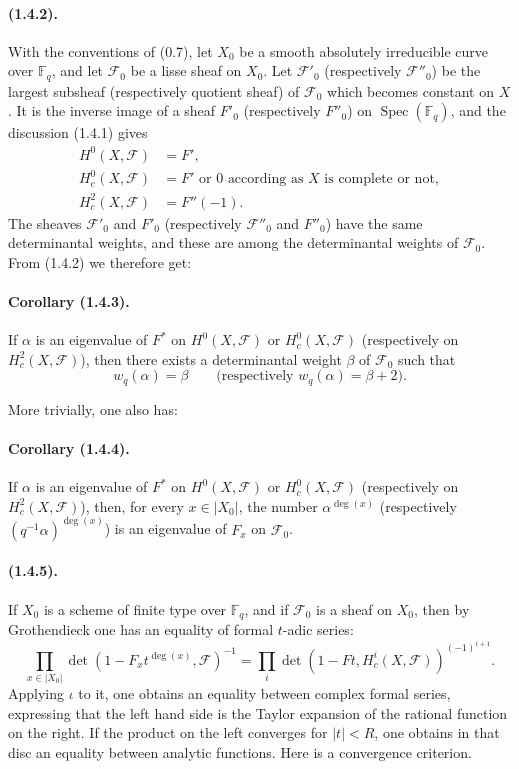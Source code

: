 \documentclass[11pt]{article}
\theoremstyle{remark}
\newcommand{\Fq}{\mathbb{F}_q}
\newcommand{\Spec}{\operatorname{Spec}}
\begin{document}
\paragraph{(1.4.2).} With the conventions of (0.7), let $X_0$ be a smooth absolutely irreducible curve over $\Fq$, and let $\mathcal F_0$ be a lisse sheaf on $X_0$. Let $\mathcal F'_0$ (respectively $\mathcal F''_0$) be the largest subsheaf (respectively quotient sheaf) of $\mathcal F_0$ which becomes constant on $X$. It is the inverse image of a sheaf $F'_0$ (respectively $F''_0$) on $\Spec(\Fq)$, and the discussion (1.4.1) gives
\begin{align}
H^0(X,\mathcal F)&=F',\tag{1.4.2.1}\\
H^0_c(X,\mathcal F)&=F'\text{ or }0\text{ according as }X\text{ is complete or not},\tag{1.4.2.2}\\
H^2_c(X,\mathcal F)&=F''(-1).\tag{1.4.2.3}
\end{align}
The sheaves $\mathcal F'_0$ and $F'_0$ (respectively $\mathcal F''_0$ and $F''_0$) have the same determinantal weights, and these are among the determinantal weights of $\mathcal F_0$. From (1.4.2) we therefore get:

\paragraph{Corollary (1.4.3).} If $\alpha$ is an eigenvalue of $F^*$ on $H^0(X,\mathcal F)$ or $H^0_c(X,\mathcal F)$ (respectively on $H^2_c(X,\mathcal F)$), then there exists a determinantal weight $\beta$ of $\mathcal F_0$ such that
\[
w_q(\alpha)=\beta \qquad \text{(respectively } w_q(\alpha)=\beta+2\text{)}.
\]

More trivially, one also has:

\paragraph{Corollary (1.4.4).} If $\alpha$ is an eigenvalue of $F^*$ on $H^0(X,\mathcal F)$ or $H^0_c(X,\mathcal F)$ (respectively on $H^2_c(X,\mathcal F)$), then, for every $x\in |X_0|$, the number $\alpha^{\deg(x)}$ (respectively $(q^{-1}\alpha)^{\deg(x)}$) is an eigenvalue of $F_x$ on $\mathcal F_0$.

\paragraph{(1.4.5).} If $X_0$ is a scheme of finite type over $\Fq$, and if $\mathcal F_0$ is a sheaf on $X_0$, then by Grothendieck one has an equality of formal $t$-adic series:
\begin{equation}\tag{1.4.5.1}
\prod_{x\in |X_0|}\det(1-F_x t^{\deg(x)},\mathcal F)^{-1}
=
\prod_i\det(1-Ft,H^i_c(X,\mathcal F))^{(-1)^{i+1}}.
\end{equation}
Applying $\iota$ to it, one obtains an equality between complex formal series, expressing that the left hand side is the Taylor expansion of the rational function on the right. If the product on the left converges for $|t|<R$, one obtains in that disc an equality between analytic functions. Here is a convergence criterion.
\end{document}
